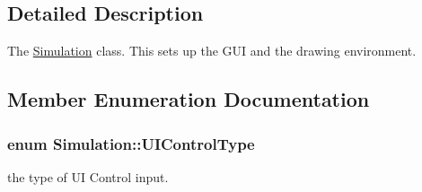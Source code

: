 \subsection{Detailed Description}
The \hyperlink{classSimulation}{Simulation} class. This sets up the G\-U\-I and the drawing environment. 

\subsection{Member Enumeration Documentation}
\hypertarget{classSimulation_a0fd1c91d4e7699e893929d56b60a60bf}{
\subsubsection[{U\-I\-Control\-Type}]{\setlength{\rightskip}{0pt plus 5cm}enum {\bf Simulation\-::\-U\-I\-Control\-Type}}}\label{classSimulation_a0fd1c91d4e7699e893929d56b60a60bf}


the type of U\-I Control input. 

